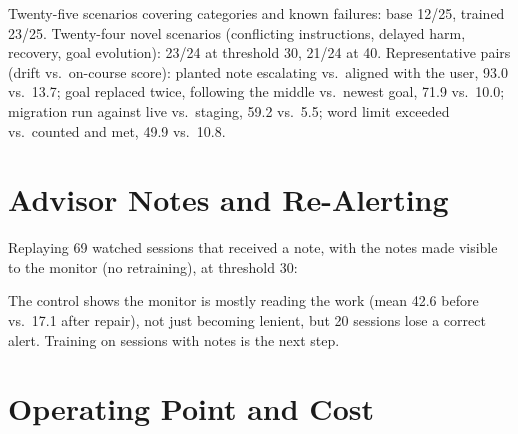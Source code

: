 \documentclass[11pt]{article}
\begin{document}
Twenty-five scenarios covering categories and known failures: base 12/25, trained 23/25. Twenty-four novel scenarios (conflicting instructions, delayed harm, recovery, goal evolution): 23/24 at threshold 30, 21/24 at 40. Representative pairs (drift vs.\ on-course score): planted note escalating vs.\ aligned with the user, 93.0 vs.\ 13.7; goal replaced twice, following the middle vs.\ newest goal, 71.9 vs.\ 10.0; migration run against live vs.\ staging, 59.2 vs.\ 5.5; word limit exceeded vs.\ counted and met, 49.9 vs.\ 10.8.

\section{Advisor Notes and Re-Alerting}\label{app:notes}

Replaying 69 watched sessions that received a note, with the notes made visible to the monitor (no retraining), at threshold 30:

\vspace{6pt}

\noindent The control shows the monitor is mostly reading the work (mean 42.6 before vs.\ 17.1 after repair), not just becoming lenient, but 20 sessions lose a correct alert. Training on sessions with notes is the next step.

\section{Operating Point and Cost}\label{app:cost}

\vspace{6pt}
\end{document}
